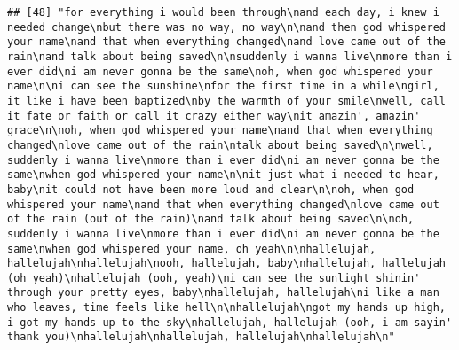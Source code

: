 \documentclass[]{article}
\begin{document}
\begin{verbatim}
## [48] "for everything i would been through\nand each day, i knew i needed change\nbut there was no way, no way\n\nand then god whispered your name\nand that when everything changed\nand love came out of the rain\nand talk about being saved\n\nsuddenly i wanna live\nmore than i ever did\ni am never gonna be the same\noh, when god whispered your name\n\ni can see the sunshine\nfor the first time in a while\ngirl, it like i have been baptized\nby the warmth of your smile\nwell, call it fate or faith or call it crazy either way\nit amazin', amazin' grace\n\noh, when god whispered your name\nand that when everything changed\nlove came out of the rain\ntalk about being saved\n\nwell, suddenly i wanna live\nmore than i ever did\ni am never gonna be the same\nwhen god whispered your name\n\nit just what i needed to hear, baby\nit could not have been more loud and clear\n\noh, when god whispered your name\nand that when everything changed\nlove came out of the rain (out of the rain)\nand talk about being saved\n\noh, suddenly i wanna live\nmore than i ever did\ni am never gonna be the same\nwhen god whispered your name, oh yeah\n\nhallelujah, hallelujah\nhallelujah\nooh, hallelujah, baby\nhallelujah, hallelujah (oh yeah)\nhallelujah (ooh, yeah)\ni can see the sunlight shinin' through your pretty eyes, baby\nhallelujah, hallelujah\ni like a man who leaves, time feels like hell\n\nhallelujah\ngot my hands up high, i got my hands up to the sky\nhallelujah, hallelujah (ooh, i am sayin' thank you)\nhallelujah\nhallelujah, hallelujah\nhallelujah\n"                                                                                                                                                                                                                                                                                                                                                                                                                                                                                                                                                                                                                                                                                                                                                                                                                                                                                                                                                                                                                                                                                                                                                                                                                                                                                                                                                                  

\end{verbatim}
\end{document}
